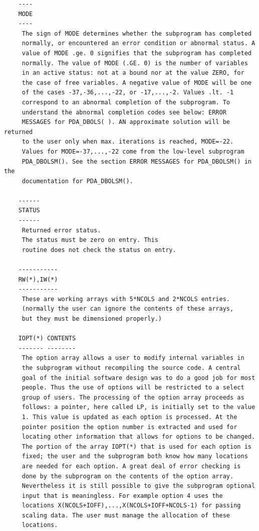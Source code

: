\documentclass[11pt,twoside]{article}
\begin{document}
\begin{verbatim}
    ----
    MODE
    ----
     The sign of MODE determines whether the subprogram has completed
     normally, or encountered an error condition or abnormal status. A
     value of MODE .ge. 0 signifies that the subprogram has completed
     normally. The value of MODE (.GE. 0) is the number of variables
     in an active status: not at a bound nor at the value ZERO, for
     the case of free variables. A negative value of MODE will be one
     of the cases -37,-36,...,-22, or -17,...,-2. Values .lt. -1
     correspond to an abnormal completion of the subprogram. To
     understand the abnormal completion codes see below: ERROR
     MESSAGES for PDA_DBOLS( ). AN approximate solution will be returned
     to the user only when max. iterations is reached, MODE=-22.
     Values for MODE=-37,...,-22 come from the low-level subprogram
     PDA_DBOLSM(). See the section ERROR MESSAGES for PDA_DBOLSM() in the
     documentation for PDA_DBOLSM().

    ------
    STATUS
    ------
     Returned error status.
     The status must be zero on entry. This
     routine does not check the status on entry.

    -----------
    RW(*),IW(*)
    -----------
     These are working arrays with 5*NCOLS and 2*NCOLS entries.
     (normally the user can ignore the contents of these arrays,
     but they must be dimensioned properly.)

    IOPT(*) CONTENTS
    ------- --------
     The option array allows a user to modify internal variables in
     the subprogram without recompiling the source code. A central
     goal of the initial software design was to do a good job for most
     people. Thus the use of options will be restricted to a select
     group of users. The processing of the option array proceeds as
     follows: a pointer, here called LP, is initially set to the value
     1. This value is updated as each option is processed. At the
     pointer position the option number is extracted and used for
     locating other information that allows for options to be changed.
     The portion of the array IOPT(*) that is used for each option is
     fixed; the user and the subprogram both know how many locations
     are needed for each option. A great deal of error checking is
     done by the subprogram on the contents of the option array.
     Nevertheless it is still possible to give the subprogram optional
     input that is meaningless. For example option 4 uses the
     locations X(NCOLS+IOFF),...,X(NCOLS+IOFF+NCOLS-1) for passing
     scaling data. The user must manage the allocation of these
     locations.


\end{verbatim}
\end{document}
